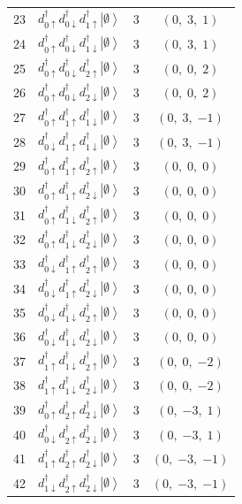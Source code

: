 \documentclass[11pt,a4paper]{article}
\newcommand{\ua}{\uparrow}
\newcommand{\da}{\downarrow}
\newcommand{\ket}[1]{\left|#1\right\rangle}
\newcommand{\empt}{\ket{\emptyset}}
\newcommand{\ddag}{d^{\dagger}}
\begin{document}
{\begin{longtable}{rp{8.6cm}cc}
23 & $\ddag_{0\ua}\ddag_{0\da}\ddag_{1\ua}\empt$
   & 3 & $(0,\;3,\;1)$ \\
24 & $\ddag_{0\ua}\ddag_{0\da}\ddag_{1\da}\empt$
   & 3 & $(0,\;3,\;1)$ \\
25 & $\ddag_{0\ua}\ddag_{0\da}\ddag_{2\ua}\empt$
   & 3 & $(0,\;0,\;2)$ \\
26 & $\ddag_{0\ua}\ddag_{0\da}\ddag_{2\da}\empt$
   & 3 & $(0,\;0,\;2)$ \\
27 & $\ddag_{0\ua}\ddag_{1\ua}\ddag_{1\da}\empt$
   & 3 & $(0,\;3,\;{-1})$ \\
28 & $\ddag_{0\da}\ddag_{1\ua}\ddag_{1\da}\empt$
   & 3 & $(0,\;3,\;{-1})$ \\
29 & $\ddag_{0\ua}\ddag_{1\ua}\ddag_{2\ua}\empt$
   & 3 & $(0,\;0,\;0)$ \\
30 & $\ddag_{0\ua}\ddag_{1\ua}\ddag_{2\da}\empt$
   & 3 & $(0,\;0,\;0)$ \\
31 & $\ddag_{0\ua}\ddag_{1\da}\ddag_{2\ua}\empt$
   & 3 & $(0,\;0,\;0)$ \\
32 & $\ddag_{0\ua}\ddag_{1\da}\ddag_{2\da}\empt$
   & 3 & $(0,\;0,\;0)$ \\
33 & $\ddag_{0\da}\ddag_{1\ua}\ddag_{2\ua}\empt$
   & 3 & $(0,\;0,\;0)$ \\
34 & $\ddag_{0\da}\ddag_{1\ua}\ddag_{2\da}\empt$
   & 3 & $(0,\;0,\;0)$ \\
35 & $\ddag_{0\da}\ddag_{1\da}\ddag_{2\ua}\empt$
   & 3 & $(0,\;0,\;0)$ \\
36 & $\ddag_{0\da}\ddag_{1\da}\ddag_{2\da}\empt$
   & 3 & $(0,\;0,\;0)$ \\
37 & $\ddag_{1\ua}\ddag_{1\da}\ddag_{2\ua}\empt$
   & 3 & $(0,\;0,\;{-2})$ \\
38 & $\ddag_{1\ua}\ddag_{1\da}\ddag_{2\da}\empt$
   & 3 & $(0,\;0,\;{-2})$ \\
39 & $\ddag_{0\ua}\ddag_{2\ua}\ddag_{2\da}\empt$
   & 3 & $(0,\;{-3},\;1)$ \\
40 & $\ddag_{0\da}\ddag_{2\ua}\ddag_{2\da}\empt$
   & 3 & $(0,\;{-3},\;1)$ \\
41 & $\ddag_{1\ua}\ddag_{2\ua}\ddag_{2\da}\empt$
   & 3 & $(0,\;{-3},\;{-1})$ \\
42 & $\ddag_{1\da}\ddag_{2\ua}\ddag_{2\da}\empt$
   & 3 & $(0,\;{-3},\;{-1})$ \\[3pt]
\midrule


\end{longtable}}
\end{document}
